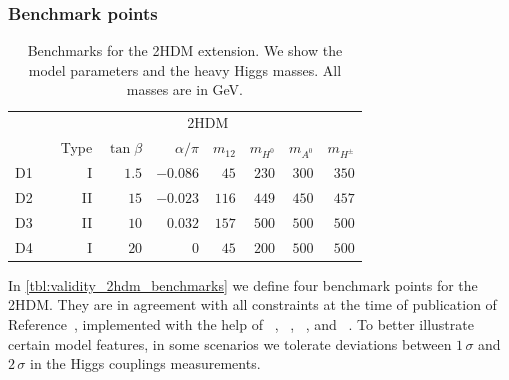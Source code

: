 \subsubsection{Benchmark points}

\begin{table} 
  \begin{tabular}{c c rrrrrrr }
    \toprule
    \multirow{2}{*}{} && \multicolumn{7}{c}{2HDM} \\
    \cmidrule{3-9}
    && Type & $\tan\beta$ & $\alpha/\pi$
    & $m_{12} $ & $m_{H^0} $ & $m_{A^0} $ & $m_{H^\pm}$ \\
    \midrule
    D1 && I & $1.5$ & $-0.086$ & $45$ & $230$ & $300$ & $350$ \\
    D2 && II & $15$ & $-0.023$ & $116$ & $449$ & $450$ & $457$ \\
    D3 && II & $10$ & $0.032$ & $157$ & $500$ & $500$ & $500$ \\
    D4 && I & $20$ & $0$ & $45$ & $200$ & $500$ & $500$ \\
    \bottomrule
  \end{tabular}
 \caption[Benchmarks for the 2HDM model]{Benchmarks
   for the 2HDM extension. We show the model
   parameters and the heavy Higgs masses. All masses are in GeV.}
 \label{tbl:validity_2hdm_benchmarks}
\end{table}

In \autoref{tbl:validity_2hdm_benchmarks} we define four benchmark
points for the 2HDM. They are in agreement with all constraints at the
time of publication of Reference~\cite{Brehmer:2015rna}, implemented with
the help of ~\cite{Eriksson:2009ws},
~\cite{Bechtle:2008jh, Bechtle:2011sb},
~\cite{Mahmoudi:2008tp}, and
~\cite{Bechtle:2013xfa}. To better illustrate
certain model features, in some scenarios we tolerate deviations
between $1\,\sigma$ and $2\,\sigma$ in the Higgs couplings
measurements.

